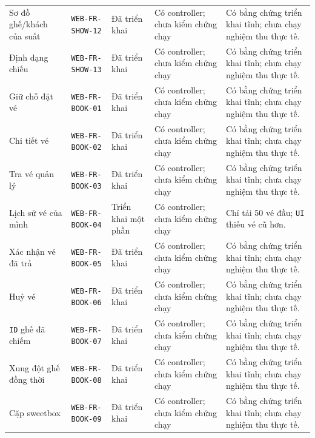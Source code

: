 \begin{longtable}{@{}P{0.19000\SRSWidth}P{0.18000\SRSWidth}P{0.15000\SRSWidth}P{0.20000\SRSWidth}P{0.28000\SRSWidth}@{}}
Sơ đồ ghế/\allowbreak{}khách của suất & \texttt{WEB-\allowbreak{}FR-\allowbreak{}SHOW-\allowbreak{}12} & Đã triển khai & Có controller; chưa kiểm chứng chạy & Có bằng chứng triển khai tĩnh; chưa chạy nghiệm thu thực tế. \\[3pt]
Định dạng chiếu & \texttt{WEB-\allowbreak{}FR-\allowbreak{}SHOW-\allowbreak{}13} & Đã triển khai & Có controller; chưa kiểm chứng chạy & Có bằng chứng triển khai tĩnh; chưa chạy nghiệm thu thực tế. \\[3pt]
Giữ chỗ đặt vé & \texttt{WEB-\allowbreak{}FR-\allowbreak{}BOOK-\allowbreak{}01} & Đã triển khai & Có controller; chưa kiểm chứng chạy & Có bằng chứng triển khai tĩnh; chưa chạy nghiệm thu thực tế. \\[3pt]
Chi tiết vé & \texttt{WEB-\allowbreak{}FR-\allowbreak{}BOOK-\allowbreak{}02} & Đã triển khai & Có controller; chưa kiểm chứng chạy & Có bằng chứng triển khai tĩnh; chưa chạy nghiệm thu thực tế. \\[3pt]
Tra vé quản lý & \texttt{WEB-\allowbreak{}FR-\allowbreak{}BOOK-\allowbreak{}03} & Đã triển khai & Có controller; chưa kiểm chứng chạy & Có bằng chứng triển khai tĩnh; chưa chạy nghiệm thu thực tế. \\[3pt]
Lịch sử vé của mình & \texttt{WEB-\allowbreak{}FR-\allowbreak{}BOOK-\allowbreak{}04} & Triển khai một phần & Có controller; chưa kiểm chứng chạy & Chỉ tải 50 vé đầu; \texttt{UI} thiếu vé cũ hơn. \\[3pt]
Xác nhận vé đã trả & \texttt{WEB-\allowbreak{}FR-\allowbreak{}BOOK-\allowbreak{}05} & Đã triển khai & Có controller; chưa kiểm chứng chạy & Có bằng chứng triển khai tĩnh; chưa chạy nghiệm thu thực tế. \\[3pt]
Huỷ vé & \texttt{WEB-\allowbreak{}FR-\allowbreak{}BOOK-\allowbreak{}06} & Đã triển khai & Có controller; chưa kiểm chứng chạy & Có bằng chứng triển khai tĩnh; chưa chạy nghiệm thu thực tế. \\[3pt]
\texttt{ID} ghế đã chiếm & \texttt{WEB-\allowbreak{}FR-\allowbreak{}BOOK-\allowbreak{}07} & Đã triển khai & Có controller; chưa kiểm chứng chạy & Có bằng chứng triển khai tĩnh; chưa chạy nghiệm thu thực tế. \\[3pt]
Xung đột ghế đồng thời & \texttt{WEB-\allowbreak{}FR-\allowbreak{}BOOK-\allowbreak{}08} & Đã triển khai & Có controller; chưa kiểm chứng chạy & Có bằng chứng triển khai tĩnh; chưa chạy nghiệm thu thực tế. \\[3pt]
Cặp sweetbox & \texttt{WEB-\allowbreak{}FR-\allowbreak{}BOOK-\allowbreak{}09} & Đã triển khai & Có controller; chưa kiểm chứng chạy & Có bằng chứng triển khai tĩnh; chưa chạy nghiệm thu thực tế. \\[3pt]

\end{longtable}
